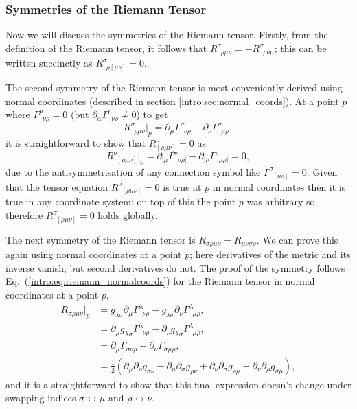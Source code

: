 \subsubsection{Symmetries of the Riemann Tensor}
Now we will discuss the symmetries of the Riemann tensor. Firstly, from the definition of the Riemann tensor, it follows that $R^\sigma_{\,\,\,\rho \mu\nu} = -R^\sigma_{\,\,\,\rho\nu\mu}$; this can be written succinctly as $R^\sigma_{\,\,\,\rho[\mu\nu]}=0$. 

The second symmetry of the Riemann tensor is most conveniently derived using normal coordinates (described in section \ref{intro:sec:normal_coords}). At a point $p$ where $\Gamma^\mu_{\,\,\,\nu\rho}=0$ (but $\partial_\alpha \Gamma^\mu_{\,\,\,\nu\rho}\neq 0$) to get
\begin{equation}
R^\sigma_{\,\,\,\rho\mu\nu}\big|_{p} = \partial_\mu \Gamma^\sigma_{\,\,\,\nu\rho}  - \partial_\nu \Gamma^\sigma_{\,\,\,\mu\rho}, \label{intro:eq:riemann_normalcoords}
\end{equation}
it is straightforward to show that $R^\sigma_{[\rho\mu\nu]}=0$ as
\begin{equation}
R^\sigma_{\,\,\,[\rho\mu\nu]}\big|_{p} = \partial_{[\mu} \Gamma^\sigma_{\,\,\,\nu\rho]}  - \partial_{[\nu} \Gamma^\sigma_{\,\,\,\mu\rho]}=0,
\end{equation}
due to the antisymmetrisation of any connection symbol like $\Gamma^\sigma_{\,\,\,[\nu\rho]}=0$. Given that the tensor equation $R^\sigma_{\,\,\,[\rho\mu\nu]}=0$ is true at $p$ in normal coordinates then it is true in any coordinate system; on top of this the point $p$ was arbitrary so therefore $R^\sigma_{\,\,\,[\rho\mu\nu]}=0$ holds globally.

The next symmetry of the Riemann tensor is $R_{\sigma\rho\mu\nu} = R_{\mu\nu\sigma\rho}$. We can prove this again using normal coordinates at a point $p$; here derivatives of the metric and its inverse vanish, but second derivatives do not. The proof of the symmetry follows Eq.~(\ref{intro:eq:riemann_normalcoords}) for the Riemann tensor in normal coordinates at a point $p$,
\begin{align}
R_{\sigma\rho\mu\nu}\big|_p &= g_{\lambda\sigma}\partial_\mu \Gamma^\lambda_{\,\,\,\nu\rho}  - g_{\lambda\sigma}\partial_\nu \Gamma^\lambda_{\,\,\,\mu\rho} , \\
&= \partial_\mu g_{\lambda\sigma} \Gamma^\lambda_{\,\,\,\nu\rho}  - \partial_\nu g_{\lambda\sigma} \Gamma^\lambda_{\,\,\,\mu\rho} , \\
&= \partial_\mu \Gamma_{\sigma\nu\rho}  - \partial_\nu  \Gamma_{\sigma\mu\rho} , \\
&= \frac{1}{2}\left(\partial_{\mu} \partial_\rho g_{\sigma\nu} - \partial_{\mu} \partial_\sigma g_{\rho\nu} + \partial_{\nu} \partial_\sigma g_{\rho\mu} - \partial_{\nu} \partial_\rho g_{\sigma\mu}\right),
\end{align}
and it is a straightforward to show that this final expression doesn't change under swapping indices $\sigma\leftrightarrow\mu$ and $\rho\leftrightarrow\nu$.

